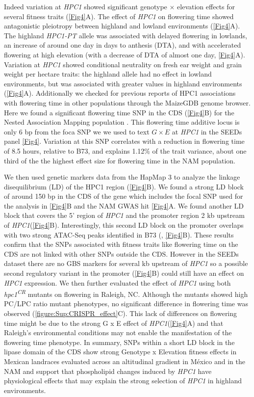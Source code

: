 \documentclass[9pt,twocolumn,twoside,lineno]{biorxiv}
\newcommand{\hpc}{\textit{HPC1}\xspace}
\begin{document}
Indeed variation at \hpc showed significant genotype $\times$ elevation effects for several fitness traits (\cref{Fig4}A). 
The effect of \hpc on flowering time showed antagonistic pleiotropy between highland and lowland environments (\cref{Fig4}A). 
The highland \textit{HPC1-PT} allele was associated with delayed flowering in lowlands, an increase of around one day in days to anthesis (DTA), and with accelerated flowering at high elevation (with a decrease of DTA of almost one day, \cref{Fig4}A).
Variation at \hpc showed conditional neutrality on fresh ear weight and grain weight per hectare traits: the highland allele had no effect in lowland environments, but was associated with greater values in highland environments (\cref{Fig4}A).
Additionally we checked for previous reports of HPC1 associations with flowering time in other populations through the MaizeGDB \cite{Woodhouse2021-wd} genome browser. 
Here we found a significant flowering time SNP in the  CDS (\cref{Fig4}B) for the Nested Association Mapping population \cite{Wallace2014-yy}. 
This flowering time additive locus is only 6 bp from the foca SNP we we used to text  $G \times E$ at \hpc in the SEEDs panel \cref{Fig4}. 
Variation at this SNP correlates with a reduction in flowering time of 8.5 hours, relative to B73, and explains 1.12\% of the trait variance, about one third of the the highest effect size for flowering time in the NAM population. 

We then used genetic markers data from the HapMap 3 \cite{Bukowski2017-ng} to analyze the linkage disequilibrium (LD) of the HPC1 region (\cref{Fig4}B).
We found a strong LD block of around 150 bp in the CDS of the gene which includes the focal SNP used for the analysis in \cref{Fig4}B and the  NAM GWAS hit \cref{Fig4}A. 
We found another LD block that covers the 5' region of \hpc and the promoter region 2 kb upstream of \hpc (\cref{Fig4}B). 
Interestingly, this second LD block on the promoter overlaps with two strong ATAC-Seq peaks identified in B73 (\cite{Ricci2019-zj}, \cref{Fig4}B).
These results confirm that the SNPs associated with fitness traits like flowering time on the  CDS are not linked with other SNPs outside the  CDS.
However in the SEEDs dataset there are no GBS markers for several kb upstream of \hpc so a possible second regulatory variant in the promoter (\cref{Fig4}B) could still have an effect on \hpc expression. We then further evaluated the effect of \hpc using both \textit{hpc1\textsuperscript{CR}} mutants on flowering in Raleigh, NC. 
Although the mutants showed high PC/LPC ratio mutant phenotypes, no significant difference in flowering time was observed (\cref{figure:Sup:CRISPR_effect}C). 
This lack of differences on flowering time might be due to the strong G x E effect of \hpc (\cref{Fig4}A) and that Raleigh's environmental conditions may not enable the manifestation of the flowering time phenotype.
In summary, SNPs within a short LD block in the lipase domain of the  CDS show strong Genotype x Elevation fitness effects in Mexican landraces evaluated across an altitudinal gradient in M\'exico and in the NAM and support that phospholipid changes induced by \hpc have physiological effects that may explain the strong selection of \hpc in highland environments.
\end{document}
